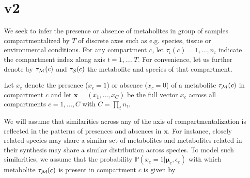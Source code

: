 \documentclass[a4paper,10pt]{article}
\def\P{\mathbb{P}}
\def\x{\boldsymbol{x}}
\def\M{{\cal M}}
\def\S{{\cal S}}
\def\bmu{\boldsymbol{\mu}}
\begin{document}
%
%
%





\section{v2}
We seek to infer the presence or absence of metabolites in group of samples compartmentalized by $T$ of discrete axes such as e.g. species, tissue or environmental conditions. For any compartment $c$, let $\tau_t(c) = 1, \ldots, n_t$ indicate the compartment index along axis $t=1, \ldots, T$. For convenience, let us further denote by $\tau_\M(c)$ and $\tau_\S(c)$ the metabolite and species of that compartment.

Let $x_{c}$ denote the presence ($x_c=1$) or absence ($x_c=0$) of a metabolite $\tau_\M(c)$ in compartment $c$ and let $\x=(x_1, \ldots, x_C)$ be the full vector $x_c$ across all compartments $c=1, \ldots, C$ with $C=\prod_t n_t$.

We will assume that similarities across any of the axis of compartmentalization is reflected in the patterns of presences and absences in $\x$. For instance, closely related species may share a similar set of metabolites and  metabolites related in their synthesis may share a similar distribution across species. To model such similarities, we assume that the probability $\P(x_c=1|\bmu_c, \epsilon_c)$ with which metabolite $\tau_\M(c)$ is present in compartment $c$ is given by
\end{document}
